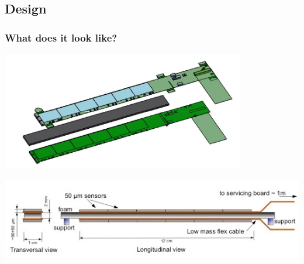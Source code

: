 \documentclass{beamer}
\begin{document}
\begin{frame}
\end{frame}

\subsection{Design}

\begin{frame}
  \frametitle{What does it look like?}

  \vspace{-0.2cm}
  \begin{center}
    \includegraphics[width = 0.8\textwidth]{Pictures/Plume2_vue_eclatee.jpg}

  \end{center}

  \vspace{-0.2cm}
  \begin{center}
    \includegraphics[width = 10 cm]{Pictures/scheme_plume.png}

  \end{center}
\end{frame}
\end{document}
